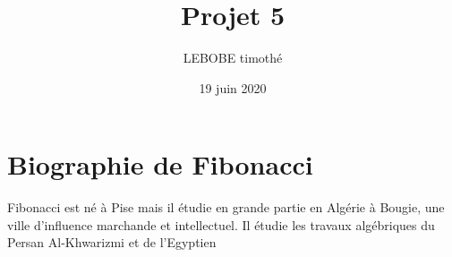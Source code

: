 \documentclass{article}
\title{Projet 5}
\author{LEBOBE timothé}
\date{19 juin 2020}
\begin{document}
    \maketitle
    \tableofcontents

    \section{Biographie de Fibonacci}
        Fibonacci est né à Pise mais il étudie en grande partie en Algérie à Bougie, une ville d'influence marchande et intellectuel.
        Il étudie les travaux algébriques du Persan Al-Khwarizmi et de l'Egyptien 
\end{document}
